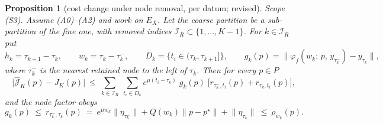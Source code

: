 \documentclass[11pt]{article}
\newtheorem{proposition}{Proposition}
\theoremstyle{remark}\newtheorem{remark}{Remark}
\newcommand{\pstar}{p^\star}
\newcommand{\norm}[1]{\lVert #1\rVert}
\newcommand{\flow}[3]{\varphi_f(#1;\,#2,\,#3)}
\newcommand{\hatJ}{\hat{\mathcal J}}
\newcommand{\rev}[1]{\textcolor{blue!55!black}{#1}}
\begin{document}
\begin{proposition}[cost change under node removal, per datum; \rev{revised}]\label{prop:removal}
\emph{Scope (S3).} Assume (A0)--(A2) and work on $E_X$. Let the coarse partition be a sub-partition of the fine one, with removed indices $\mathcal I_R\subset\{1,\dots,K-1\}$. For $k\in\mathcal I_R$ put
\[
h_k=\tau_{k+1}-\tau_k,\qquad w_k=\tau_k-\tau_k^{-},\qquad
D_k=\{t_i\in(\tau_k,\tau_{k+1}]\},\qquad
g_k(p)=\big\lVert\flow{w_k}{p}{y_{\tau_k^{-}}}-y_{\tau_k}\big\rVert ,
\]
where $\tau_k^{-}$ is the nearest \emph{retained} node to the left of $\tau_k$. Then for every $p\in P$
\begin{equation}
\big|\hatJ_K(p)-J_K(p)\big|\ \le\
\sum_{k\in\mathcal I_R}\ \sum_{t_i\in D_k}
e^{\mu(t_i-\tau_k)}\;g_k(p)\;\Big[r_{\tau_k^{-},t_i}(p)+r_{\tau_k,t_i}(p)\Big],
\label{eq:prop_removal_datum}
\end{equation}
and the node factor obeys
\begin{equation}
g_k(p)\ \le\ r_{\tau_k^{-},\tau_k}(p)
\ =\ e^{\mu w_k}\norm{\eta_{\tau_k^{-}}}+Q(w_k)\norm{p-\pstar}+\norm{\eta_{\tau_k}}
\ \le\ \rho_{w_k}(p).
\label{eq:gk}
\end{equation}
\end{proposition}
\end{document}
